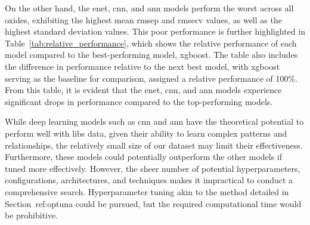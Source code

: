 On the other hand, the \gls{enet}, \gls{cnn}, and \gls{ann} models perform the worst across all oxides, exhibiting the highest mean \gls{rmsep} and \gls{rmsecv} values, as well as the highest standard deviation values.
This poor performance is further highlighted in Table~\ref{tab:relative_performance}, which shows the relative performance of each model compared to the best-performing model, \gls{xgboost}.
The table also includes the difference in performance relative to the next best model, with \gls{xgboost} serving as the baseline for comparison, assigned a relative performance of 100\%.
From this table, it is evident that the \gls{enet}, \gls{cnn}, and \gls{ann} models experience significant drops in performance compared to the top-performing models.

While deep learning models such as \gls{cnn} and \gls{ann} have the theoretical potential to perform well with \gls{libs} data, given their ability to learn complex patterns and relationships, the relatively small size of our dataset may limit their effectiveness.
Furthermore, these models could potentially outperform the other models if tuned more effectively.
However, the sheer number of potential hyperparameters, configurations, architectures, and techniques makes it impractical to conduct a comprehensive search.
Hyperparameter tuning akin to the method detailed in Section~{ref:optuna} could be pursued, but the required computational time would be prohibitive.




